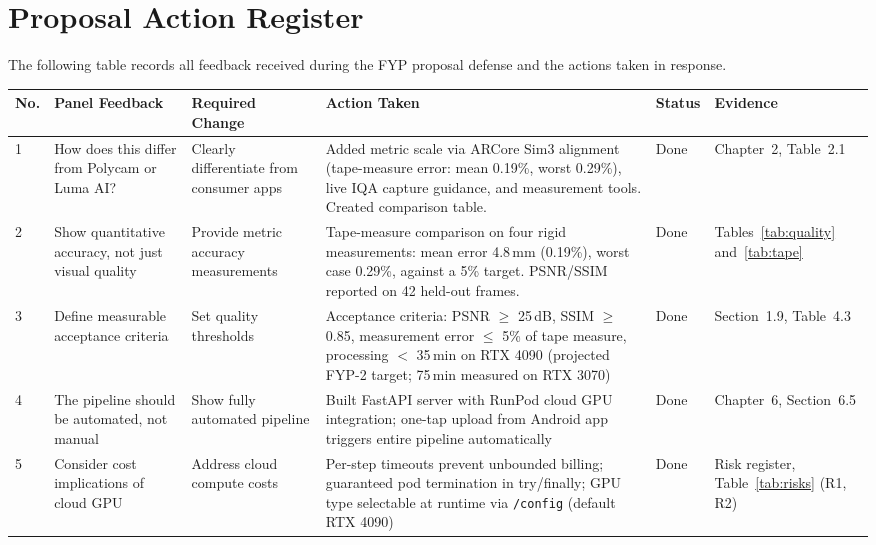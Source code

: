 \chapter{Proposal Action Register}

The following table records all feedback received during the FYP proposal defense and the actions taken in response.

\begin{longtable}{p{}p{}p{}p{}p{}p{}}
\toprule
\textbf{No.} & \textbf{Panel Feedback} & \textbf{Required Change} & \textbf{Action Taken} & \textbf{Status} & \textbf{Evidence} \\
\midrule
\endhead
1 & How does this differ from Polycam or Luma AI? & Clearly differentiate from consumer apps & Added metric scale via ARCore Sim3 alignment (tape-measure error: mean 0.19\%, worst 0.29\%), live IQA capture guidance, and measurement tools. Created comparison table. & Done & Chapter~2, Table~2.1 \\
\midrule
2 & Show quantitative accuracy, not just visual quality & Provide metric accuracy measurements & Tape-measure comparison on four rigid measurements: mean error 4.8\,mm (0.19\%), worst case 0.29\%, against a 5\% target. PSNR/SSIM reported on 42 held-out frames. & Done & Tables~\ref{tab:quality} and~\ref{tab:tape} \\
\midrule
3 & Define measurable acceptance criteria & Set quality thresholds & Acceptance criteria: PSNR $\geq$ 25\,dB, SSIM $\geq$ 0.85, measurement error $\leq$ 5\% of tape measure, processing $<$ 35\,min on RTX 4090 (projected FYP-2 target; 75\,min measured on RTX 3070) & Done & Section~1.9, Table~4.3 \\
\midrule
4 & The pipeline should be automated, not manual & Show fully automated pipeline & Built FastAPI server with RunPod cloud GPU integration; one-tap upload from Android app triggers entire pipeline automatically & Done & Chapter~6, Section~6.5 \\
\midrule
5 & Consider cost implications of cloud GPU & Address cloud compute costs & Per-step timeouts prevent unbounded billing; guaranteed pod termination in try/finally; GPU type selectable at runtime via \texttt{/config} (default RTX 4090) & Done & Risk register, Table~\ref{tab:risks} (R1, R2) \\
\bottomrule
\end{longtable}
